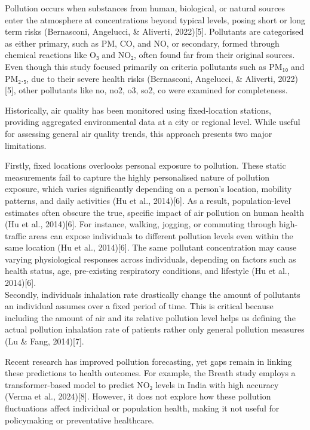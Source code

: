 \documentclass[
]{article}
\begin{document}
Pollution occurs when substances from human, biological, or natural
sources enter the atmosphere at concentrations beyond typical levels,
posing short or long term risks (Bernasconi, Angelucci, \& Aliverti,
2022){[}5{]}. Pollutants are categorised as either primary, such as PM,
CO, and NO, or secondary, formed through chemical reactions like O₃ and
NO₂, often found far from their original sources. Even though this study
focused primarily on criteria pollutants such as PM₁₀ and PM₂.₅, due to
their severe health risks (Bernasconi, Angelucci, \& Aliverti,
2022){[}5{]}, other pollutants like no, no2, o3, so2, co were examined
for completeness.

Historically, air quality has been monitored using fixed-location
stations, providing aggregated environmental data at a city or regional
level. While useful for assessing general air quality trends, this
approach presents two major limitations.

Firstly, fixed locations overlooks personal exposure to pollution. These
static measurements fail to capture the highly personalised nature of
pollution exposure, which varies significantly depending on a person's
location, mobility patterns, and daily activities (Hu et al.,
2014){[}6{]}. As a result, population-level estimates often obscure the
true, specific impact of air pollution on human health (Hu et al.,
2014){[}6{]}. For instance, walking, jogging, or commuting through
high-traffic areas can expose individuals to different pollution levels
even within the same location (Hu et al., 2014){[}6{]}. The same
pollutant concentration may cause varying physiological responses across
individuals, depending on factors such as health status, age,
pre-existing respiratory conditions, and lifestyle (Hu et al.,
2014){[}6{]}.\\
Secondly, individuals inhalation rate drastically change the amount of
pollutants an individual assumes over a fixed period of time. This is
critical because including the amount of air and its relative pollution
level helps us defining the actual pollution inhalation rate of patients
rather only general pollution measures (Lu \& Fang, 2014){[}7{]}.

Recent research has improved pollution forecasting, yet gaps remain in
linking these predictions to health outcomes. For example, the Breath
study employs a transformer-based model to predict NO₂ levels in India
with high accuracy (Verma et al., 2024){[}8{]}. However, it does not
explore how these pollution fluctuations affect individual or population
health, making it not useful for policymaking or preventative
healthcare.
\end{document}
